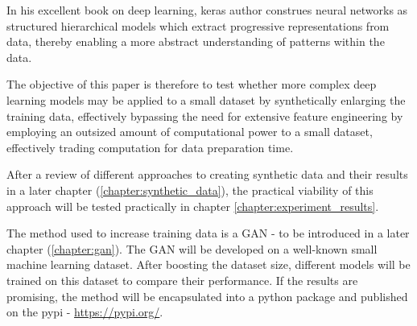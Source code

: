 In his excellent book on deep learning, keras author \cite{chollet2017deep} construes neural networks as structured hierarchical models which extract progressive representations from data, thereby enabling a more abstract understanding of patterns within the data.

The objective of this paper is therefore to test whether more complex deep learning models may be applied to a small dataset by synthetically enlarging the training data, effectively bypassing the need for extensive feature engineering by employing an outsized amount of computational power to a small dataset, effectively trading computation for data preparation time.

After a review of different approaches to creating synthetic data and their results in a later chapter (\ref{chapter:synthetic_data}), the practical viability of this approach will be tested practically in chapter \ref{chapter:experiment_results}.

The method used to increase training data is a \ac{GAN} - to be introduced in a later chapter (\ref{chapter:gan}).
The \ac{GAN} will be developed on a well-known small machine learning dataset. After boosting the dataset size, different models will be trained on this dataset to compare their performance. If the results are promising, the method will be encapsulated into a python package and published on the \ac{pypi} - \url{https://pypi.org/}.
